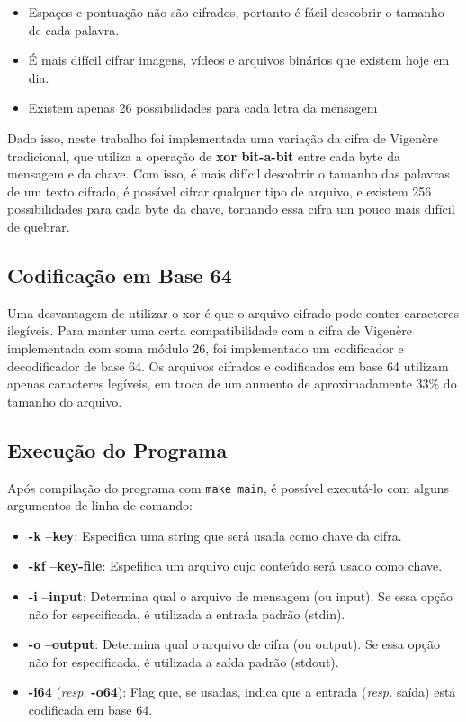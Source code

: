 \documentclass[conference]{IEEEtran}
\begin{document}
\begin{itemize}
    \item Espaços e pontuação não são cifrados, portanto é fácil descobrir o tamanho de cada
        palavra.
    \item É mais difícil cifrar imagens, vídeos e arquivos binários que existem
        hoje em dia.
    \item Existem apenas 26 possibilidades para cada letra da mensagem
\end{itemize}

Dado isso, neste trabalho foi implementada uma variação da cifra de Vigenère
tradicional, que utiliza a operação de \textbf{xor bit-a-bit} entre cada byte da mensagem
e da chave. Com isso, é mais difícil descobrir o tamanho das palavras de um
texto cifrado, é possível cifrar qualquer tipo de arquivo, e existem 256
possibilidades para cada byte da chave, tornando essa cifra um pouco mais
difícil de quebrar.

\subsection{Codificação em Base 64}
\label{sec:base64}
Uma desvantagem de utilizar o xor é que o arquivo cifrado pode conter caracteres
ilegíveis. Para manter uma certa compatibilidade com a cifra de Vigenère
implementada com soma módulo 26, foi implementado um codificador e decodificador
de base 64. Os arquivos cifrados e codificados em base 64 utilizam apenas
caracteres legíveis, em troca de um aumento de aproximadamente 33\% do tamanho
do arquivo.

\subsection{Execução do Programa}
\label{sec:exec-main}
Após compilação do programa com \verb|make main|, é possível executá-lo com
alguns argumentos de linha de comando:

\begin{itemize}
    \item \textbf{-k} \textbf{--key}: Especifica uma string que será usada como
        chave da cifra.
    \item \textbf{-kf} \textbf{--key-file}: Espefifica um arquivo cujo conteúdo
        será usado como chave.
    \item \textbf{-i} \textbf{--input}: Determina qual o arquivo de mensagem (ou
        input). Se essa opção não for especificada, é utilizada a entrada padrão
        (stdin).
    \item \textbf{-o} \textbf{--output}: Determina qual o arquivo de cifra (ou
        output). Se essa opção não for especificada, é utilizada a saída padrão
        (stdout).
    \item \textbf{-i64} (\textit{resp.} \textbf{-o64}): Flag que, se usadas,
        indica que a entrada (\textit{resp.} saída) está codificada em base 64.
\end{itemize}
\end{document}
